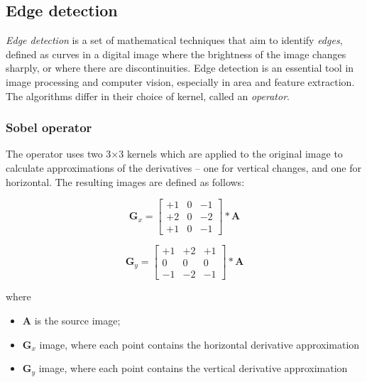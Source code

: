 \subsection{Edge detection}

\emph{Edge detection} is a set of mathematical techniques that aim to identify \emph{edges}, defined as curves in a digital image where the brightness of the image changes sharply, or where there are discontinuities. Edge detection is an essential tool in image processing and computer vision, especially in area and feature extraction. The algorithms differ in their choice of kernel, called an \emph{operator}. \cite{Digital_Image_Processing_2}

\subsubsection{Sobel operator}

The operator uses two 3×3 kernels which are applied to the original image to calculate approximations of the derivatives – one for vertical changes, and one for horizontal. The resulting images are defined as follows: \cite{sobel_article}

\begin{equation}
    \mathbf{G}_x = 
    \begin{bmatrix}
        +1 & 0 & -1\\
        +2 & 0 & -2\\
        +1 & 0 & -1
    \end{bmatrix} * \mathbf{A}
\end{equation}

\begin{equation}
    \mathbf{G}_y = 
    \begin{bmatrix}
        +1 & +2 & +1\\
        0 & 0 & 0\\
        -1 & -2 & -1
    \end{bmatrix} * \mathbf{A}
\end{equation}

where
\begin{itemize}
    \item $\mathbf{A}$ is the source image;
    \item $\mathbf{G}_x$ image, where each point contains the horizontal derivative approximation
    \item $\mathbf{G}_y$ image, where each point contains the vertical derivative approximation
\end{itemize}

